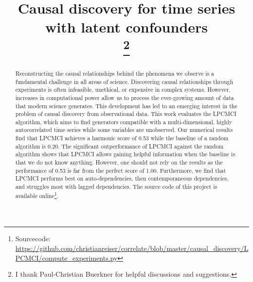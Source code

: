 \documentclass[conference]{IEEEtran}
\begin{document}
\title{Causal discovery for time series with latent confounders\\
\thanks{I thank Paul-Christian Buerkner for helpful discussions and
suggestions.}
}

\author{






}

\maketitle

\begin{abstract}
Reconstructing the causal relationships behind the phenomena we observe is a fundamental challenge in all areas of science.
Discovering causal relationships through experiments is often infeasible, unethical, or expensive in complex systems. 
However, increases in computational power allow us to process the ever-growing amount of data that modern science generates.
This development has led to an emerging interest in the problem of causal discovery from observational data.
This work evaluates the LPCMCI algorithm, which aims to find generators compatible with a multi-dimensional, highly autocorrelated time series while some variables are unobserved.
Our numerical results find that LPCMCI achieves a harmonic score of 0.53 while the baseline of a random algorithm is 0.20. 
The significant outperformance of LPCMCI against the random algorithm shows that LPCMCI allows gaining helpful information when the
baseline is that we do not know anything. However, one should not rely on the results as the performance of 0.53 is far
from the perfect score of 1.00. 
Furthermore, we find that LPCMCI performs best on auto-dependencies, then contemporaneous dependencies, and struggles most with lagged dependencies.
The source code of this project is available online\footnote{Sourcecode: \href{https://github.com/christianreiser/correlate/blob/master/causal_discovery/LPCMCI/compute_experiments.py}{https://github.com/christianreiser/correlate/blob/master/causal\_discovery/LPCMCI/compute\_experiments.py}}.
\end{abstract}
\end{document}

